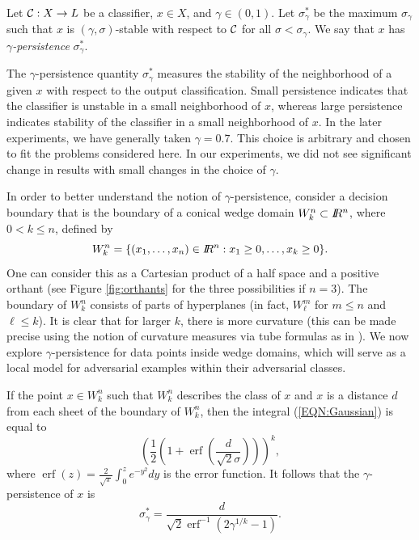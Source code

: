 

\begin{definition}
    Let $\mathcal{C}:X\to L$ be a classifier, $x \in X$, and $\gamma\in(0,1)$. Let $\sigma_\gamma^*$ be the maximum $\sigma_\gamma$ such that $x$ is $(\gamma, \sigma)$-stable with respect to $\mathcal{C}$ for all $\sigma<\sigma_\gamma$. We say that $x$ has \emph{$\gamma$-persistence} $\sigma_\gamma^*$.
\end{definition}

The $\gamma$-persistence quantity $\sigma_\gamma^*$ measures the stability of the neighborhood of a given $x$ with respect to the output classification. Small persistence indicates that the classifier is unstable in a small neighborhood of $x$, whereas large persistence indicates stability of the classifier in a small neighborhood of $x$. In the later experiments, we have generally taken $\gamma = 0.7$. This choice is arbitrary and chosen to fit the problems considered here. In our experiments, we did not see significant change in results with small changes in the choice of $\gamma$.

In order to better understand the notion of $\gamma$-persistence, consider a decision boundary that is the boundary of a conical wedge domain $W^n_k \subset I\!\!R^n$, where $0<k\leq n$, defined by 
\[
    W^n_k = \{(x_1, \ldots, x_n) \in I\!\!R^n : x_1 \geq 0, \ldots, x_k \geq 0\}.
\]
One can consider this as a Cartesian product of a half space and a positive orthant (see Figure \ref{fig:orthants} for the three possibilities if $n=3$). The boundary of $W^n_k$ consists of parts of hyperplanes (in fact, $W^m_\ell$ for $m\leq n$ and $\ell \leq k$). It is clear that for larger $k$, there is more curvature (this can be made precise using the notion of curvature measures via tube formulas as in \cite{morvan}). We now explore $\gamma$-persistence for data points inside wedge domains, which will serve as a local model for adversarial examples within their adversarial classes.

\begin{proposition} \label{prop:orthants}
    If the point $x \in W^n_k$ such that $W^n_k$ describes the class of $x$ and $x$ is a distance $d$ from each sheet of the boundary of $W^n_k$, then the integral (\ref{EQN:Gaussian}) is equal to
\[
    \left( \frac{1}{2}\left(  1+\operatorname{erf}\left(  \frac{d}{\sqrt
    {2}\sigma}\right)  \right) \right)^k,
\]
    where $\operatorname{erf}(z)=\frac{2}{\sqrt{\pi}}\int_0^z e^{-y^2}dy$ is the error function.
    It follows that the $\gamma$-persistence of $x$ is
\[
    \sigma_\gamma^* = \frac{d}{\sqrt{2}\operatorname{erf}^{-1} \left( 2 \gamma^{1/k} -1\right)}.
\]
\end{proposition}

